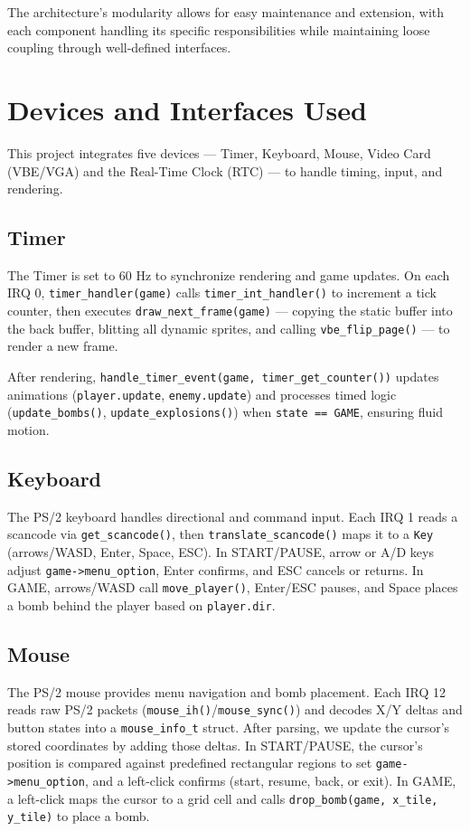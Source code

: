 \documentclass[12pt,a4paper]{article}
\begin{document}
The architecture's modularity allows for easy maintenance and extension, with each component handling its specific responsibilities while maintaining loose coupling through well-defined interfaces.

\section{Devices and Interfaces Used}

This project integrates five devices --- Timer, Keyboard, Mouse, Video Card (VBE/VGA) and the  Real-Time Clock (RTC) --- to handle timing, input, and rendering.

\subsection{Timer}

The Timer is set to 60 Hz to synchronize rendering and game updates. On each IRQ 0, \texttt{timer\_handler(game)} calls \texttt{timer\_int\_handler()} to increment a tick counter, then executes \texttt{draw\_next\_frame(game)} --- copying the static buffer into the back buffer, blitting all dynamic sprites, and calling \texttt{vbe\_flip\_page()} --- to render a new frame.

After rendering, \texttt{handle\_timer\_event(game, timer\_get\_counter())} updates animations (\texttt{player.update}, \texttt{enemy.update}) and processes timed logic (\texttt{update\_bombs()}, \texttt{update\_explosions()}) when \texttt{state == GAME}, ensuring fluid motion.

\subsection{Keyboard}

The PS/2 keyboard handles directional and command input. Each IRQ 1 reads a scancode via \texttt{get\_scancode()}, then \texttt{translate\_scancode()} maps it to a \texttt{Key} (arrows/WASD, Enter, Space, ESC). In START/PAUSE, arrow or A/D keys adjust \texttt{game->menu\_option}, Enter confirms, and ESC cancels or returns. In GAME, arrows/WASD call \texttt{move\_player()}, Enter/ESC pauses, and Space places a bomb behind the player based on \texttt{player.dir}.

\subsection{Mouse}

The PS/2 mouse provides menu navigation and bomb placement. Each IRQ 12 reads raw PS/2 packets (\texttt{mouse\_ih()}/\texttt{mouse\_sync()}) and decodes X/Y deltas and button states into a \texttt{mouse\_info\_t} struct. After parsing, we update the cursor's stored coordinates by adding those deltas. In START/PAUSE, the cursor's position is compared against predefined rectangular regions to set \texttt{game->menu\_option}, and a left-click confirms (start, resume, back, or exit). In GAME, a left-click maps the cursor to a grid cell and calls \texttt{drop\_bomb(game, x\_tile, y\_tile)} to place a bomb.
\end{document}
